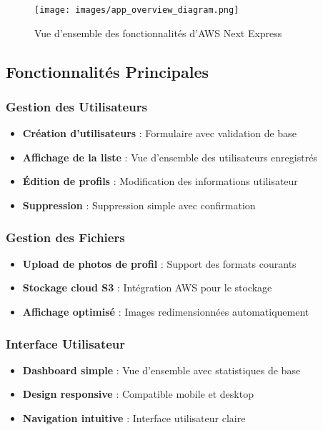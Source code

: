 \begin{figure}[H]
    \centering
    \texttt{[image: images/app\_overview\_diagram.png]}
    \caption{Vue d'ensemble des fonctionnalités d'AWS Next Express}
    \label{fig:app_overview}
\end{figure}

\subsection{Fonctionnalités Principales}

\subsubsection{Gestion des Utilisateurs}
\begin{itemize}
    \item \textbf{Création d'utilisateurs} : Formulaire avec validation de base
    \item \textbf{Affichage de la liste} : Vue d'ensemble des utilisateurs enregistrés
    \item \textbf{Édition de profils} : Modification des informations utilisateur
    \item \textbf{Suppression} : Suppression simple avec confirmation
\end{itemize}

\subsubsection{Gestion des Fichiers}
\begin{itemize}
    \item \textbf{Upload de photos de profil} : Support des formats courants
    \item \textbf{Stockage cloud S3} : Intégration AWS pour le stockage
    \item \textbf{Affichage optimisé} : Images redimensionnées automatiquement
\end{itemize}

\subsubsection{Interface Utilisateur}
\begin{itemize}
    \item \textbf{Dashboard simple} : Vue d'ensemble avec statistiques de base
    \item \textbf{Design responsive} : Compatible mobile et desktop
    \item \textbf{Navigation intuitive} : Interface utilisateur claire
\end{itemize}

